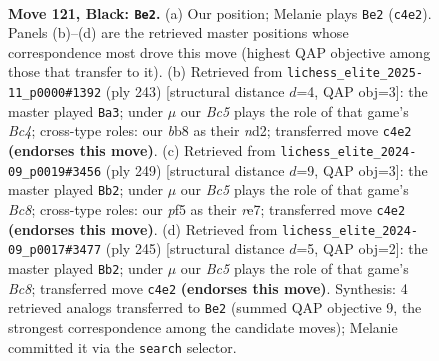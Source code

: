 \documentclass[11pt]{article}
\begin{document}
\clearpage

\begin{figure}[p]\centering
\begin{subfigure}{0.46\textwidth}\centering
\resizebox{\linewidth}{!}{%
\newchessgame
\chessboard[
  setfen={1B4k1/8/7K/5P2/1nb5/8/8/8 b - - 0 121},
  showmover=false,
  pgfstyle=straightmove, color=movearrow, markmove={c4-e2}
]}
\caption{}
\end{subfigure}\hfill
\begin{subfigure}{0.46\textwidth}\centering
\resizebox{\linewidth}{!}{%
\newchessgame
\chessboard[
  setfen={8/5P2/8/2b5/5K2/8/3N1k2/8 b - - 74 122},
  showmover=false,
  pgfstyle=straightmove, color=movearrow, markmove={c5-a3}
]}
\caption{}
\end{subfigure}
\\[4pt]
\begin{subfigure}{0.46\textwidth}\centering
\resizebox{\linewidth}{!}{%
\newchessgame
\chessboard[
  setfen={8/4R3/7k/5K2/8/8/8/2b5 b - - 50 125},
  showmover=false,
  pgfstyle=straightmove, color=movearrow, markmove={c1-b2}
]}
\caption{}
\end{subfigure}\hfill
\begin{subfigure}{0.46\textwidth}\centering
\resizebox{\linewidth}{!}{%
\newchessgame
\chessboard[
  setfen={8/8/8/8/5k2/3K4/7p/2b4B b - - 5 123},
  showmover=false,
  pgfstyle=straightmove, color=movearrow, markmove={c1-b2}
]}
\caption{}
\end{subfigure}
\caption{\textbf{Move 121, Black: \texttt{Be2}.} (a) Our position; Melanie plays \texttt{Be2} (\texttt{c4e2}). Panels (b)--(d) are the retrieved master positions whose correspondence most drove this move (highest QAP objective among those that transfer to it). (b) Retrieved from \texttt{lichess\_elite\_2025-11\_p0000\#1392} (ply 243) [structural distance $d$=4, QAP obj=3]: the master played \texttt{Ba3}; under $\mu$ our \emph{Bc5} plays the role of that game's \emph{Bc4}; cross-type roles: our \emph{b}b8 as their \emph{n}d2; transferred move \texttt{c4e2} \textbf{(endorses this move)}. (c) Retrieved from \texttt{lichess\_elite\_2024-09\_p0019\#3456} (ply 249) [structural distance $d$=9, QAP obj=3]: the master played \texttt{Bb2}; under $\mu$ our \emph{Bc5} plays the role of that game's \emph{Bc8}; cross-type roles: our \emph{p}f5 as their \emph{r}e7; transferred move \texttt{c4e2} \textbf{(endorses this move)}. (d) Retrieved from \texttt{lichess\_elite\_2024-09\_p0017\#3477} (ply 245) [structural distance $d$=5, QAP obj=2]: the master played \texttt{Bb2}; under $\mu$ our \emph{Bc5} plays the role of that game's \emph{Bc8}; transferred move \texttt{c4e2} \textbf{(endorses this move)}. Synthesis: 4 retrieved analogs transferred to \texttt{Be2} (summed QAP objective 9, the strongest correspondence among the candidate moves); Melanie committed it via the \texttt{search} selector.}
\label{fig:thought-m241}
\end{figure}
\end{document}
